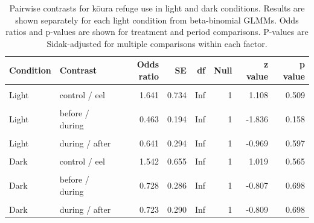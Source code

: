 \documentclass[
  letterpaper,
  DIV=11,
  numbers=noendperiod]{scrartcl}
\begin{document}
\begingroup\fontsize{9}{11}\selectfont

\begin{longtable}[t]{llrrrrrr}

\caption{\label{tbl-emmeans-stratified}Pairwise contrasts for kōura
refuge use in light and dark conditions. Results are shown separately
for each light condition from beta-binomial GLMMs. Odds ratios and
p-values are shown for treatment and period comparisons. P-values are
Sidak-adjusted for multiple comparisons within each factor.}

\tabularnewline

\toprule
Condition & Contrast & Odds ratio & SE & df & Null & z value & p value\\
\midrule
\cellcolor{gray!8}{Light} & \cellcolor{gray!8}{control / catfish} & \cellcolor{gray!8}{0.863} & \cellcolor{gray!8}{0.396} & \cellcolor{gray!8}{Inf} & \cellcolor{gray!8}{1} & \cellcolor{gray!8}{-0.322} & \cellcolor{gray!8}{0.944}\\
Light & control / eel & 1.641 & 0.734 & Inf & 1 & 1.108 & 0.509\\
\cellcolor{gray!8}{Light} & \cellcolor{gray!8}{catfish / eel} & \cellcolor{gray!8}{1.903} & \cellcolor{gray!8}{0.866} & \cellcolor{gray!8}{Inf} & \cellcolor{gray!8}{1} & \cellcolor{gray!8}{1.414} & \cellcolor{gray!8}{0.333}\\
Light & before / during & 0.463 & 0.194 & Inf & 1 & -1.836 & 0.158\\
\cellcolor{gray!8}{Light} & \cellcolor{gray!8}{before / after} & \cellcolor{gray!8}{0.297} & \cellcolor{gray!8}{0.135} & \cellcolor{gray!8}{Inf} & \cellcolor{gray!8}{1} & \cellcolor{gray!8}{-2.672} & \cellcolor{gray!8}{0.021}\\
\addlinespace
Light & during / after & 0.641 & 0.294 & Inf & 1 & -0.969 & 0.597\\
\cellcolor{gray!8}{Dark} & \cellcolor{gray!8}{control / catfish} & \cellcolor{gray!8}{0.393} & \cellcolor{gray!8}{0.172} & \cellcolor{gray!8}{Inf} & \cellcolor{gray!8}{1} & \cellcolor{gray!8}{-2.133} & \cellcolor{gray!8}{0.083}\\
Dark & control / eel & 1.542 & 0.655 & Inf & 1 & 1.019 & 0.565\\
\cellcolor{gray!8}{Dark} & \cellcolor{gray!8}{catfish / eel} & \cellcolor{gray!8}{3.924} & \cellcolor{gray!8}{1.693} & \cellcolor{gray!8}{Inf} & \cellcolor{gray!8}{1} & \cellcolor{gray!8}{3.170} & \cellcolor{gray!8}{0.004}\\
Dark & before / during & 0.728 & 0.286 & Inf & 1 & -0.807 & 0.698\\
\addlinespace
\cellcolor{gray!8}{Dark} & \cellcolor{gray!8}{before / after} & \cellcolor{gray!8}{0.527} & \cellcolor{gray!8}{0.215} & \cellcolor{gray!8}{Inf} & \cellcolor{gray!8}{1} & \cellcolor{gray!8}{-1.569} & \cellcolor{gray!8}{0.259}\\
Dark & during / after & 0.723 & 0.290 & Inf & 1 & -0.809 & 0.698\\
\bottomrule

\end{longtable}
\end{document}

